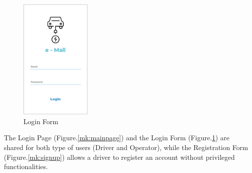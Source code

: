 \documentclass[../main.tex]{subfiles}
\begin{document}
\begin{figure}[!htb]
  \centering
  \begin{minipage}[b]{0.3\textwidth}
    \includegraphics[width=35mm]{Mockups/mk_loginpage.png}
    \caption{Login Form}
    \label{mk:login}
  \end{minipage}
\end{figure}
\noindent
The Login Page (Figure.\ref{mk:mainpage}) and the Login Form (Figure.\ref{mk:login}) are shared for both type of users (Driver and Operator), while the Registration Form (Figure.\ref{mk:signup}) allows a driver to register an account without privileged functionalities. 
\clearpage
\newpage
\end{document}
